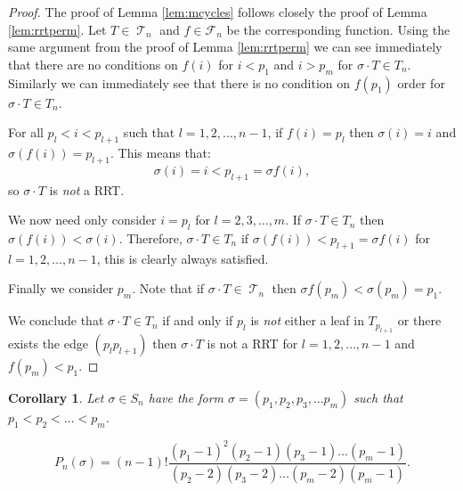 \documentclass[10pt]{amsart} %
\newtheorem{corol}{Corollary}
\theoremstyle{definition}
\DeclareMathOperator{\T}{\mathcal{T}}
\begin{document}
\begin{proof}
The proof of Lemma \ref{lem:mcycles} follows closely the proof of Lemma \ref{lem:rrtperm}.  Let $T \in \T_n$ and $f \in \mathcal{F}_n$ be the corresponding function.  Using the same argument from the proof of Lemma \ref{lem:rrtperm} we can see immediately that there are no conditions on $f(i)$ for $i < p_1$ and $i > p_m$ for $\sigma \cdot T \in T_n$.  Similarly we can immediately see that there is no condition on $f(p_1)$ order for $\sigma \cdot T \in T_n$.

For all $p_l < i < p_{l+1}$ such that $l = 1,2,\dots, n-1$, if $f(i) = p_l$ then $\sigma(i) = i$ and $\sigma(f(i)) = p_{l+1}$.  This means that:
\[\sigma(i) = i < p_{l+1}  = \sigma{f(i)},\]
so $\sigma \cdot T$ is \emph{not} a RRT.  %

We now need only consider $i = p_l$ for $l = 2,3,\dots,m$.  If $\sigma \cdot T \in T_n$ then $\sigma(f(i)) < \sigma(i)$. Therefore, $\sigma \cdot T \in T_n$ if $\sigma(f(i)) < p_{l+1}  = \sigma{f(i)}$ for  $l = 1,2,\dots, n-1$, this is clearly always satisfied.

Finally we consider $p_m$.  Note that if $\sigma \cdot T \in \T_n$ then $\sigma f(p_{m}) < \sigma(p_m) = p_1$. 

We conclude that $\sigma \cdot T \in T_n$ if and only if $p_l$ is \emph{not} either a leaf in $T_{p_{l+1}}$ or there exists the edge $(p_lp_{l+1})$ then $\sigma \cdot T$ is not a RRT for $l = 1,2,\dots, n-1$ and $f(p_m) < p_1$.
\end{proof}
\begin{corol}
  Let $\sigma \in S_n$ have the form $\sigma = (p_1,p_2,p_3,\dots p_m)$ such that $p_1 < p_2 < \dots < p_m$.  
  
  \[P_n(\sigma) = (n-1)!\frac{(p_1-1)^{2}(p_2 -1)(p_3-1)\dots(p_m -1)}{(p_2 - 2)(p_3 - 2)\dots(p_m-2)(p_m-1)}.\] 

  \end{corol}
\end{document}
